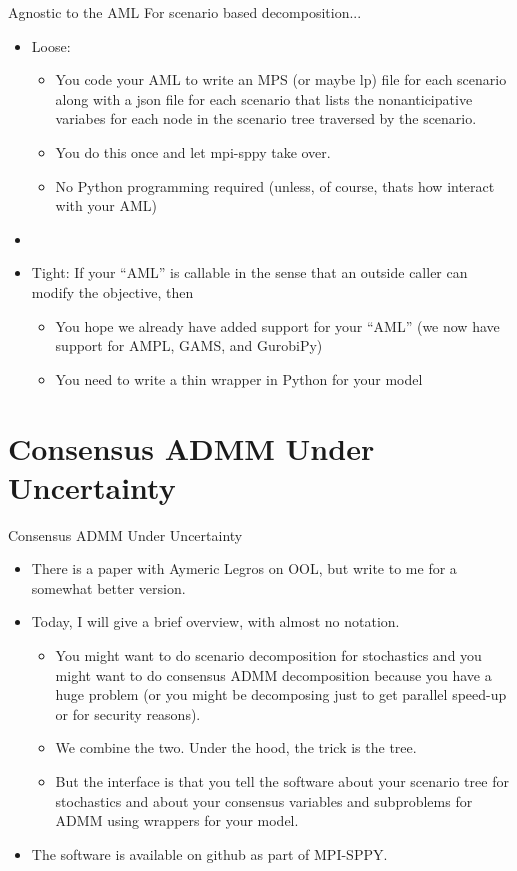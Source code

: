\documentclass[9pt,usenames,dvipsnames]{beamer}
\begin{document}
\begin{frame}{Agnostic to the AML}
  For scenario based decomposition...
  \begin{itemize}
  \item Loose:
    \begin{itemize}
    \item You code your AML to write an MPS (or maybe lp) file for each scenario along with a json file for each scenario that lists the nonanticipative variabes for each node in the scenario tree traversed by the scenario.
    \item You do this once and let mpi-sppy take over.
      \item No Python programming required (unless, of course, thats how interact with your AML)
      \end{itemize}
    \item[]
    \item Tight: If your ``AML'' is callable in the sense that an outside caller
      can modify the objective, then
      \begin{itemize}
      \item You hope we already have added support for your ``AML'' (we now have support for AMPL, GAMS, and GurobiPy)
        \item You need to write a thin wrapper in Python for your model
        \end{itemize}
  \end{itemize}
\end{frame}


\section{Consensus ADMM Under Uncertainty}

\begin{frame}{Consensus ADMM Under Uncertainty}
  \begin{itemize}
  \item There is a paper with Aymeric Legros on OOL, but write to me for a somewhat better version.
  \item Today, I will give a brief overview, with almost no notation.
    \begin{itemize}
    \item You might want to do scenario decomposition for stochastics and you might want to do consensus ADMM decomposition because you have a huge problem (or you might be decomposing just to get parallel speed-up or for security reasons).
    \item We combine the two. Under the hood, the trick is the tree.
      \item But the interface is that you tell the software about your scenario tree for stochastics and about your consensus variables and subproblems for ADMM using wrappers for your model.
      \end{itemize}
    \item The software is available on github as part of MPI-SPPY.
  \end{itemize}
\end{frame}
\end{document}
